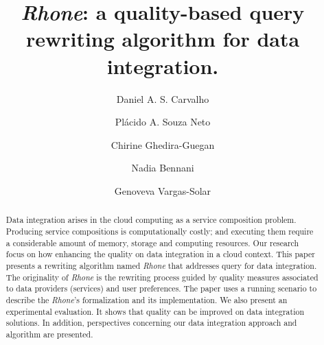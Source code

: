 \documentclass{llncs}
\theoremstyle{plain}
\theoremstyle{plain}
\theoremstyle{plain}
\theoremstyle{plain}
\begin{document}
 

\title{\textit{Rhone}: a quality-based query rewriting algorithm for data
integration.}
\author{Daniel A. S. Carvalho \and Pl\'acido
		A. Souza Neto \and Chirine Ghedira-Guegan 
		\and Nadia Bennani \and Genoveva Vargas-Solar }
 

\maketitle

  
\begin{abstract}
Data integration arises in the cloud computing as a service composition problem.
Producing service compositions is computationally costly; and executing them require a considerable amount of memory, storage and computing resources.  
Our research focus on how enhancing the quality on data integration in a cloud context.
This paper presents a rewriting algorithm named \textit{Rhone} that addresses
query for data integration. The originality of  \textit{Rhone} is the rewriting process
guided by quality measures associated to data providers (services) and user
preferences. The paper uses a running scenario to describe the \textit{Rhone}'s
formalization and its implementation. We also present an experimental
evaluation. It shows that quality can be improved on data integration solutions.
In addition, perspectives concerning our data integration approach and algorithm are presented.
\end{abstract}
 
\end{document}
